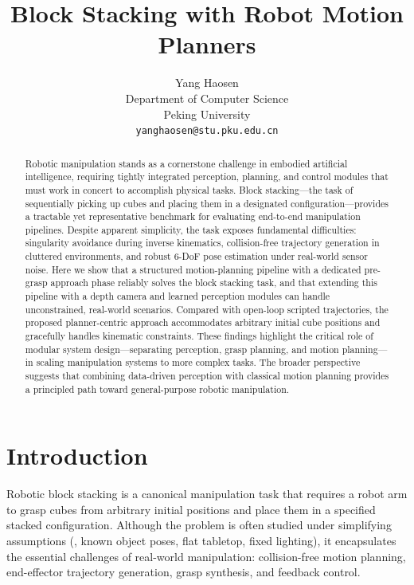 \documentclass{article}
\title{Block Stacking with Robot Motion Planners}
\author{%
  Yang Haosen \\
  Department of Computer Science \\
  Peking University \\
  \texttt{yanghaosen@stu.pku.edu.cn} \\
}
\begin{document}
\maketitle

\begin{abstract}
Robotic manipulation stands as a cornerstone challenge in embodied artificial intelligence,
requiring tightly integrated perception, planning, and control modules that must work in concert
to accomplish physical tasks.
Block stacking—the task of sequentially picking up cubes and placing them in a designated
configuration—provides a tractable yet representative benchmark for evaluating end-to-end
manipulation pipelines.
Despite apparent simplicity, the task exposes fundamental difficulties: singularity avoidance
during inverse kinematics, collision-free trajectory generation in cluttered environments, and
robust 6-DoF pose estimation under real-world sensor noise.
Here we show that a structured motion-planning pipeline with a dedicated pre-grasp approach
phase reliably solves the block stacking task, and that extending this pipeline with a depth
camera and learned perception modules can handle unconstrained, real-world scenarios.
Compared with open-loop scripted trajectories, the proposed planner-centric approach
accommodates arbitrary initial cube positions and gracefully handles kinematic constraints.
These findings highlight the critical role of modular system design—separating perception,
grasp planning, and motion planning—in scaling manipulation systems to more complex tasks.
The broader perspective suggests that combining data-driven perception with classical
motion planning provides a principled path toward general-purpose robotic manipulation.
\end{abstract}


\section{Introduction}
\label{sec:introduction}

Robotic block stacking is a canonical manipulation task that requires a robot arm to grasp
cubes from arbitrary initial positions and place them in a specified stacked configuration.
Although the problem is often studied under simplifying assumptions (\eg, known object poses,
flat tabletop, fixed lighting), it encapsulates the essential challenges of real-world
manipulation: collision-free motion planning, end-effector trajectory generation, grasp
synthesis, and feedback control.
\end{document}
